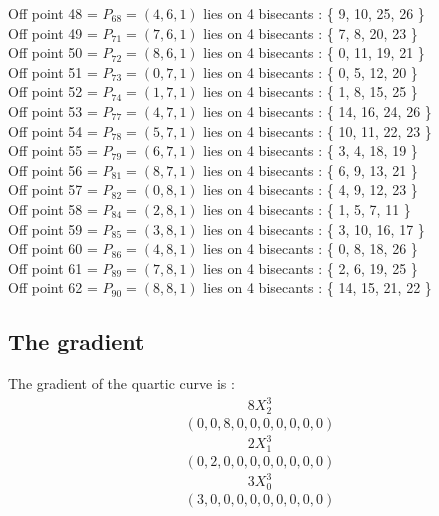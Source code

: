 \documentclass{article}
\begin{document}
{Off point 48 = $P_{68} = ( 4, 6, 1 )$ lies on 4 bisecants : \{ 9, 10, 25, 26 \}\\
Off point 49 = $P_{71} = ( 7, 6, 1 )$ lies on 4 bisecants : \{ 7, 8, 20, 23 \}\\
Off point 50 = $P_{72} = ( 8, 6, 1 )$ lies on 4 bisecants : \{ 0, 11, 19, 21 \}\\
Off point 51 = $P_{73} = ( 0, 7, 1 )$ lies on 4 bisecants : \{ 0, 5, 12, 20 \}\\
Off point 52 = $P_{74} = ( 1, 7, 1 )$ lies on 4 bisecants : \{ 1, 8, 15, 25 \}\\
Off point 53 = $P_{77} = ( 4, 7, 1 )$ lies on 4 bisecants : \{ 14, 16, 24, 26 \}\\
Off point 54 = $P_{78} = ( 5, 7, 1 )$ lies on 4 bisecants : \{ 10, 11, 22, 23 \}\\
Off point 55 = $P_{79} = ( 6, 7, 1 )$ lies on 4 bisecants : \{ 3, 4, 18, 19 \}\\
Off point 56 = $P_{81} = ( 8, 7, 1 )$ lies on 4 bisecants : \{ 6, 9, 13, 21 \}\\
Off point 57 = $P_{82} = ( 0, 8, 1 )$ lies on 4 bisecants : \{ 4, 9, 12, 23 \}\\
Off point 58 = $P_{84} = ( 2, 8, 1 )$ lies on 4 bisecants : \{ 1, 5, 7, 11 \}\\
Off point 59 = $P_{85} = ( 3, 8, 1 )$ lies on 4 bisecants : \{ 3, 10, 16, 17 \}\\
Off point 60 = $P_{86} = ( 4, 8, 1 )$ lies on 4 bisecants : \{ 0, 8, 18, 26 \}\\
Off point 61 = $P_{89} = ( 7, 8, 1 )$ lies on 4 bisecants : \{ 2, 6, 19, 25 \}\\
Off point 62 = $P_{90} = ( 8, 8, 1 )$ lies on 4 bisecants : \{ 14, 15, 21, 22 \}\\
\subsection*{The gradient}
The gradient of the quartic curve  is :
$$
\begin{array}{c}
8X_2^3\end{array}
$$
$$
( 0, 0, 8, 0, 0, 0, 0, 0, 0, 0 )$$
$$
\begin{array}{c}
2X_1^3\end{array}
$$
$$
( 0, 2, 0, 0, 0, 0, 0, 0, 0, 0 )$$
$$
\begin{array}{c}
3X_0^3\end{array}
$$
$$
( 3, 0, 0, 0, 0, 0, 0, 0, 0, 0 )$$


%


%


}%
\end{document}
